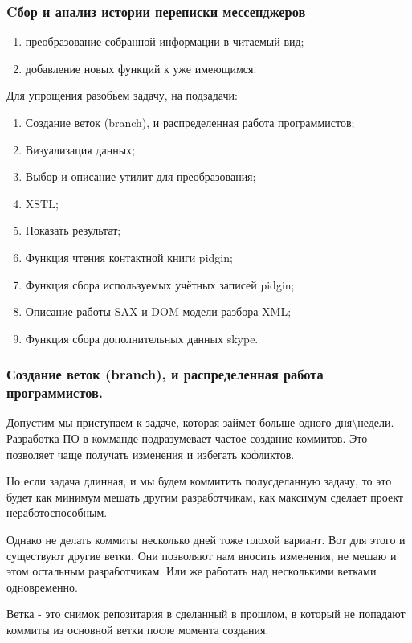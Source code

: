 \subsubsection{Cбор и анализ истории переписки мессенджеров}
 
\begin{enumerate}
\item преобразование собранной информации в читаемый вид;
\item добавление новых функций к уже имеющимся.
\end{enumerate}
Для упрощения разобьем задачу, на подзадачи:
\begin{enumerate}
\item Создание веток (branch), и распределенная работа программистов; 
\item Визуализация данных;
\item Выбор и описание утилит для преобразования;
\item XSTL;
\item Показать результат;
\item Функция чтения контактной книги pidgin;
\item Функция сбора используемых учётных записей pidgin;
\item Описание работы SAX и DOM модели разбора XML;
\item Функция сбора дополнительных данных skype.
\end{enumerate}
\subsubsection{Создание веток (branch), и распределенная работа программистов.}
Допустим мы приступаем к задаче, которая займет больше одного дня\textbackslash недели. Разработка ПО в комманде подразумевает частое создание коммитов. Это позволяет чаще получать изменения и избегать кофликтов. 

Но если задача длинная, и мы будем коммитить полусделанную задачу, то это будет как минимум мешать другим разработчикам, как максимум сделает проект неработоспособным.\cite{progit}

Однако не делать коммиты несколько дней тоже плохой вариант. Вот для этого и существуют другие ветки. Они позволяют нам вносить изменения, не мешаю и этом остальным разработчикам. Или же работать над несколькими ветками одновременно.

Ветка - это снимок репозитария в сделанный в прошлом, в который не попадают коммиты из основной ветки после момента создания.

